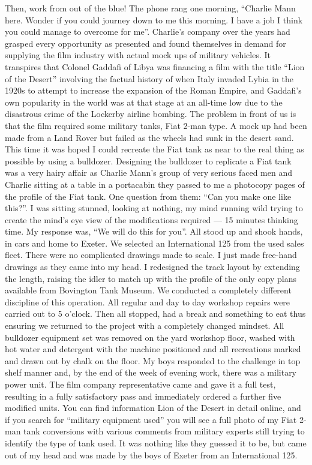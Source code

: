 Then, work from out of the blue! The phone rang one morning, ``Charlie Mann
here. Wonder if you could journey down to me this morning. I have a job I think
you could manage to overcome for me''. Charlie's company over the years had
grasped every opportunity as presented and found themselves in demand for
supplying the film industry with actual mock ups of military vehicles. It
transpires that Colonel Gaddafi of Libya was financing a film with the title
``Lion of the Desert'' involving the factual history of when Italy invaded
Lybia in the 1920s to attempt to increase the expansion of the Roman Empire,
and Gaddafi's own popularity in the world was at that stage at an all-time low
due to the disastrous crime of the Lockerby airline bombing. The problem in
front of us is that the film required some military tanks, Fiat 2-man type. A
mock up had been made from a Land Rover but failed as the wheels had sunk in
the desert sand. This time it was hoped I could recreate the Fiat tank as near
to the real thing as possible by using a bulldozer. Designing the bulldozer to
replicate a Fiat tank was a very hairy affair as Charlie Mann's group of very
serious faced men and Charlie sitting at a table in a portacabin they passed to
me a photocopy pages of the profile of the Fiat tank. One question from them:
``Can you make one like this?''. I was sitting stunned, looking at nothing, my
mind running wild trying to create the mind's eye view of the modifications
required --- 15 minutes thinking time. My response was, ``We will do this for
you''. All stood up and shook hands, in cars and home to Exeter. We selected an
International 125 from the used sales fleet. There were no complicated drawings
made to scale. I just made free-hand drawings as they came into my head. I
redesigned the track layout by extending the length, raising the idler to match
up with the profile of the only copy plans available from Bovington Tank
Museum.  We conducted a completely different discipline of this operation. All
regular and day to day workshop repairs were carried out to 5 o'clock. Then all
stopped, had a break and something to eat thus ensuring we returned to the
project with a completely changed mindset. All bulldozer equipment set was
removed on the yard workshop floor, washed with hot water and detergent with
the machine positioned and all recreations marked and drawn out by chalk on the
floor. My boys responded to the challenge in top shelf manner and, by the end
of the week of evening work, there was a military power unit. The film company
representative came and gave it a full test, resulting in a fully satisfactory
pass and immediately ordered a further five modified units. You can find
information Lion of the Desert in detail online, and if you search for
``military equipment used'' you will see a full photo of my Fiat 2-man tank
conversions with various comments from military experts still trying to
identify the type of tank used. It was nothing like they guessed it to be, but
came out of my head and was made by the boys of Exeter from an International
125.

